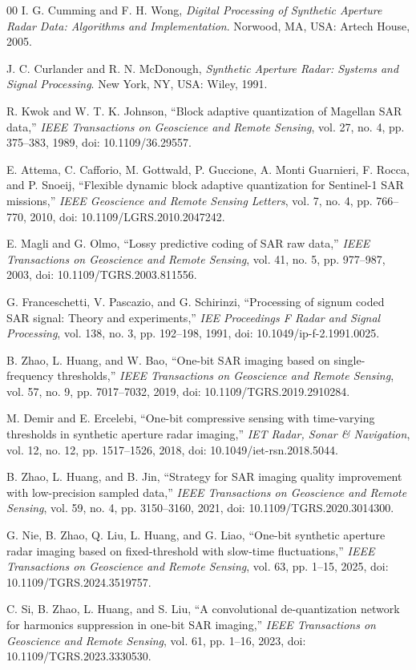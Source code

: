 \documentclass[conference]{IEEEtran}
\begin{document}
\begin{thebibliography}{00}
I. G. Cumming and F. H. Wong, \textit{Digital Processing of Synthetic Aperture Radar Data: Algorithms and Implementation}. Norwood, MA, USA: Artech House, 2005.

J. C. Curlander and R. N. McDonough, \textit{Synthetic Aperture Radar: Systems and Signal Processing}. New York, NY, USA: Wiley, 1991.

R. Kwok and W. T. K. Johnson, ``Block adaptive quantization of Magellan SAR data,'' \textit{IEEE Transactions on Geoscience and Remote Sensing}, vol. 27, no. 4, pp. 375--383, 1989, doi: 10.1109/36.29557.

E. Attema, C. Cafforio, M. Gottwald, P. Guccione, A. Monti Guarnieri, F. Rocca, and P. Snoeij, ``Flexible dynamic block adaptive quantization for Sentinel-1 SAR missions,'' \textit{IEEE Geoscience and Remote Sensing Letters}, vol. 7, no. 4, pp. 766--770, 2010, doi: 10.1109/LGRS.2010.2047242.

E. Magli and G. Olmo, ``Lossy predictive coding of SAR raw data,'' \textit{IEEE Transactions on Geoscience and Remote Sensing}, vol. 41, no. 5, pp. 977--987, 2003, doi: 10.1109/TGRS.2003.811556.

G. Franceschetti, V. Pascazio, and G. Schirinzi, ``Processing of signum coded SAR signal: Theory and experiments,'' \textit{IEE Proceedings F Radar and Signal Processing}, vol. 138, no. 3, pp. 192--198, 1991, doi: 10.1049/ip-f-2.1991.0025.

B. Zhao, L. Huang, and W. Bao, ``One-bit SAR imaging based on single-frequency thresholds,'' \textit{IEEE Transactions on Geoscience and Remote Sensing}, vol. 57, no. 9, pp. 7017--7032, 2019, doi: 10.1109/TGRS.2019.2910284.

M. Demir and E. Ercelebi, ``One-bit compressive sensing with time-varying thresholds in synthetic aperture radar imaging,'' \textit{IET Radar, Sonar \& Navigation}, vol. 12, no. 12, pp. 1517--1526, 2018, doi: 10.1049/iet-rsn.2018.5044.

B. Zhao, L. Huang, and B. Jin, ``Strategy for SAR imaging quality improvement with low-precision sampled data,'' \textit{IEEE Transactions on Geoscience and Remote Sensing}, vol. 59, no. 4, pp. 3150--3160, 2021, doi: 10.1109/TGRS.2020.3014300.

G. Nie, B. Zhao, Q. Liu, L. Huang, and G. Liao, ``One-bit synthetic aperture radar imaging based on fixed-threshold with slow-time fluctuations,'' \textit{IEEE Transactions on Geoscience and Remote Sensing}, vol. 63, pp. 1--15, 2025, doi: 10.1109/TGRS.2024.3519757.

C. Si, B. Zhao, L. Huang, and S. Liu, ``A convolutional de-quantization network for harmonics suppression in one-bit SAR imaging,'' \textit{IEEE Transactions on Geoscience and Remote Sensing}, vol. 61, pp. 1--16, 2023, doi: 10.1109/TGRS.2023.3330530.
\end{thebibliography}
\end{document}
